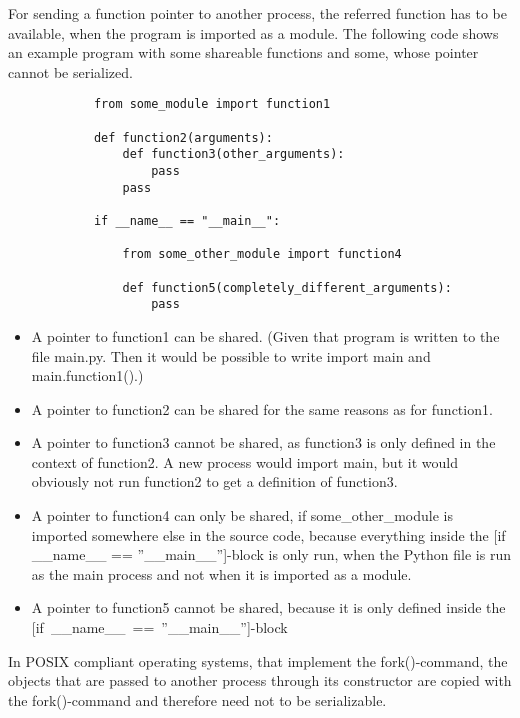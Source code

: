 		For sending a function pointer to another process, the referred function has to be available, when the program is imported as a module.
		The following code shows an example program with some shareable functions and some, whose pointer cannot be serialized.
		\begin{verbatim}
			from some_module import function1
			
			def function2(arguments):
				def function3(other_arguments):
					pass
				pass
			
			if __name__ == "__main__":
			
				from some_other_module import function4

				def function5(completely_different_arguments):
					pass
		\end{verbatim}
		\begin{itemize}
			\item A pointer to {\normalfont \ttfamily function1} can be shared. (Given that program is written to the file main.py. Then it would be possible to write {\normalfont \ttfamily import main} and {\normalfont \ttfamily main.function1()}.)
			\item A pointer to {\normalfont \ttfamily function2} can be shared for the same reasons as for {\normalfont \ttfamily function1}.
			\item A pointer to {\normalfont \ttfamily function3} cannot be shared, as {\normalfont \ttfamily function3} is only defined in the context of {\normalfont \ttfamily function2}. A new process would import {\normalfont \ttfamily main}, but it would obviously not run {\normalfont \ttfamily function2} to get a definition of {\normalfont \ttfamily function3}.
			\item A pointer to {\normalfont \ttfamily function4} can only be shared, if {\normalfont \ttfamily some\_other\_module}  is imported somewhere else in the source code, because everything inside the [{\normalfont \ttfamily if \_\_name\_\_ == ''\_\_main\_\_''}]-block is only run, when the Python file is run as the main process and not when it is imported as a module.
			\item A pointer to {\normalfont \ttfamily function5} cannot be shared, because it is only defined inside the [{\normalfont \ttfamily if~\_\_name\_\_~==~''\_\_main\_\_''}]-block
		\end{itemize}

		In POSIX compliant operating systems, that implement the fork()-command, the objects that are passed to another process through its constructor are copied with the fork()-command and therefore need not to be serializable.

